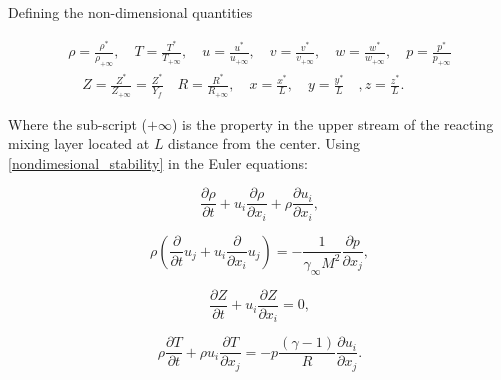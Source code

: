 Defining the non-dimensional quantities 

\begin{equation}
\begin{split} 
    \rho=\frac{\rho^*}{\rho_{+\infty}}
    ,
    \quad
    T=\frac{T^*}{T_{+\infty}}
    ,
    \quad
    u=\frac{u^*}{u_{+\infty}}
    ,
    \quad
    v=\frac{v^*}{v_{+\infty}}
    ,
    \quad
    w=\frac{w^*}{w_{+\infty}}
    ,
    \quad
    p=\frac{p^*}{p_{+\infty}}
    \\
    \quad
    Z=\frac{Z^*}{Z_{+\infty}}=\frac{Z^*}{Y_f}
    \quad
    R=\frac{R^*}{R_{+\infty}}
    ,
    \quad
    x=\frac{x^*}{L}
    ,
    \quad
    y=\frac{y^*}{L}
    \quad
    ,
    z=\frac{z^*}{L}
    .
\label{nondimesional_stability}
\end{split}
\end{equation}

Where the sub-script ($+\infty$) is the property 
in the upper stream of the reacting mixing layer located  
at $L$  distance from the center.  Using \ref{nondimesional_stability} 
in the Euler equations:

\begin{equation} 
\frac{\partial\rho}{\partial t}
+
u_i
\frac{\partial \rho}{\partial x_i} 
+
\rho
\frac{\partial u_i}{\partial x_i}
,
\end{equation} 

\begin{equation} 
\rho
\left(
\frac{\partial}{\partial t}u_j
+
u_i 
\frac{\partial}{\partial x_i}u_j
\right)
=
-
\frac{1}{\gamma_{\infty} M^{2}}
\frac{\partial p}{\partial x_j} 
,
\end{equation} 

\begin{equation} 
\frac{\partial Z}{\partial t}
+
u_i 
\frac{\partial Z}{\partial x_i}
=
0
,
\end{equation} 

\begin{equation}
\rho
\frac{\partial  T}{\partial  t}
+
\rho
u_i
\frac{\partial  T}{\partial x_j} 
= 
-
p
\frac{(\gamma-1)}{R}
\frac{\partial u_i }{\partial x_j} 
.
\end{equation} 

